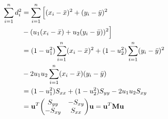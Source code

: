 \begin{equation} 
        \begin{aligned}[b]
            \sum_{i=1}^n d_i^2 
            &= \sum_{i=1}^n \Big[(x_i - \bar{x})^2+(y_i - \bar{y})^2\\
            &-(u_1(x_i - \bar{x})+u_2(y_i - \bar{y}))^2\Big] \\
            &=(1-u_1^2)\sum_{i=1}^n(x_i - \bar{x})^2+
            (1-u_2^2)\sum_{i=1}^n(y_i - \bar{y})^2\\
            &-2u_1u_2\sum_{i=1}^n(x_i - \bar{x})(y_i - \bar{y})\\
            &= (1-u_1^2)S_{xx}+
            (1-u_2^2)S_{yy}-2u_1u_2S_{xy}\\
            &=\mathbf{u}^T
            \vcenter{
                \hbox{$
                \begin{pmatrix}
                S_{yy} & -S_{xy} \\
                -S_{xy} & S_{xx}
                \end{pmatrix}
                $}
            } \label{eq:projection_matrix}
            \mathbf{u} = \mathbf{u}^T\mathbf{M}\mathbf{u}
        \end{aligned}
        \end{equation}